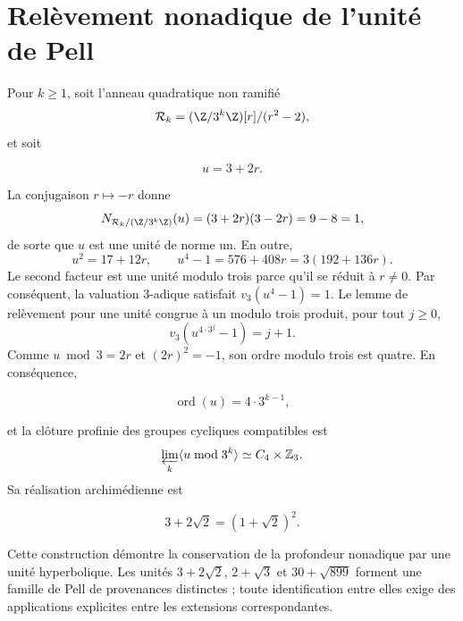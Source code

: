 \section{Relèvement nonadique de l'unité de Pell}

Pour \(k\ge1\), soit l'anneau quadratique non ramifié
\begin{equation}
\mathcal R_k=(\Z/3^k\Z)[r]/(r^2-2),
\label{eq:pell-ring}
\end{equation}
et soit

\[
u=3+2r.
\]

La conjugaison \(r\mapsto-r\) donne
\[
N_{\mathcal R_k/(\Z/3^k\Z)}(u)
=(3+2r)(3-2r)=9-8=1,
\]
de sorte que \(u\) est une unité de norme un. En outre,
\[
u^2=17+12r,\qquad
u^4-1=576+408r=3(192+136r).
\]
Le second facteur est une unité modulo trois parce qu'il se réduit à \(r\ne0\). Par
conséquent, la valuation \(3\)-adique satisfait
\(v_3(u^4-1)=1\). Le lemme de relèvement pour une unité congrue à un
modulo trois produit, pour tout \(j\ge0\),
\[
v_3\!\left(u^{4\cdot3^j}-1\right)=j+1.
\]
Comme \(u\bmod3=2r\) et \((2r)^2=-1\), son ordre modulo trois est quatre.
En conséquence,

\begin{equation}
\operatorname{ord}(u)=4\cdot3^{k-1},
\label{eq:pell-order}
\end{equation}

et la clôture profinie des groupes cycliques compatibles est
\begin{equation}
\varprojlim_k\langle u\bmod3^k\rangle
\simeq C_4\times\mathbb Z_3.
\label{eq:pell-profinite}
\end{equation}
Sa réalisation archimédienne est

\[
3+2\sqrt2=(1+\sqrt2)^2.
\]

Cette construction démontre la conservation de la profondeur nonadique
par une unité hyperbolique. Les unités \(3+2\sqrt2\),
\(2+\sqrt3\) et \(30+\sqrt{899}\) forment une famille de Pell de
provenances distinctes ; toute identification entre elles exige des
applications explicites entre les extensions correspondantes.

